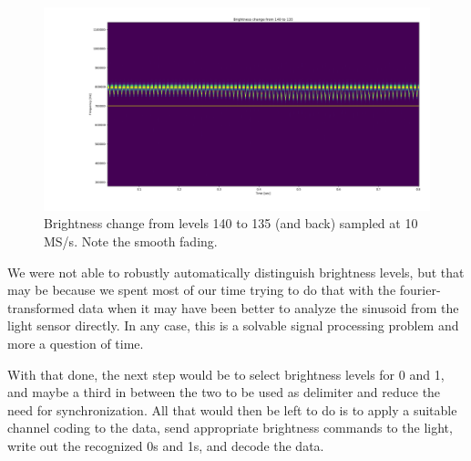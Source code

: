 \begin{figure}[h]
	\centering
	\includegraphics[width=14cm]{img/Plot_140_135.png}
	\caption{Brightness change from levels 140 to 135 (and back) sampled at 10 MS/s. Note the smooth fading.}
	\label{fig:plot-140-135}
\end{figure}

We were not able to robustly automatically distinguish brightness levels, but that may be because we spent most of our time trying to do that with the fourier-transformed data when it may have been better to analyze the sinusoid from the light sensor directly.
In any case, this is a solvable signal processing problem and more a question of time.

With that done, the next step would be to select brightness levels for 0 and 1, and maybe a third in between the two to be used as delimiter and reduce the need for synchronization.
All that would then be left to do is to apply a suitable channel coding to the data, send appropriate brightness commands to the light, write out the recognized 0s and 1s, and decode the data.
